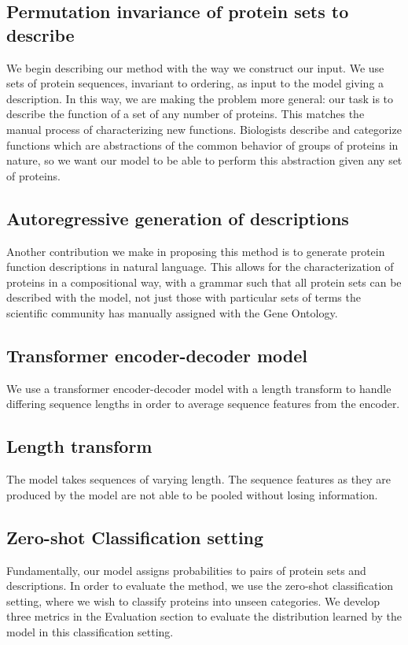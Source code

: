 \documentclass{specification}
\begin{document}
    \subsection{Permutation invariance of protein sets to describe}
    We begin describing our method with the way we construct our input. We use sets of protein sequences, invariant to ordering, as input to the model giving a description. In this way, we are making the problem more general: our task is to describe the function of a set of any number of proteins. This matches the manual process of characterizing new functions. Biologists describe and categorize functions which are abstractions of the common behavior of groups of proteins in nature, so we want our model to be able to perform this abstraction given any set of proteins.
    \subsection{Autoregressive generation of descriptions}
    Another contribution we make in proposing this method is to generate protein function descriptions in natural language. This allows for the characterization of proteins in a compositional way, with a grammar such that all protein sets can be described with the model, not just those with particular sets of terms the scientific community has manually assigned with the Gene Ontology.
    \subsection{Transformer encoder-decoder model}
    We use a transformer encoder-decoder model \cite{vaswani2017attention} with a length transform \cite{shu2020latent} to handle differing sequence lengths in order to average sequence features from the encoder.
    \subsection{Length transform}
    The model takes sequences of varying length. The sequence features as they are produced by the model are not able to be pooled without losing information.
    \subsection{Zero-shot Classification setting}
    Fundamentally, our model assigns probabilities to pairs of protein sets and descriptions. In order to evaluate the method, we use the zero-shot classification setting, where we wish to classify proteins into unseen categories. We develop three metrics in the Evaluation section to evaluate the distribution learned by the model in this classification setting.
\end{document}
